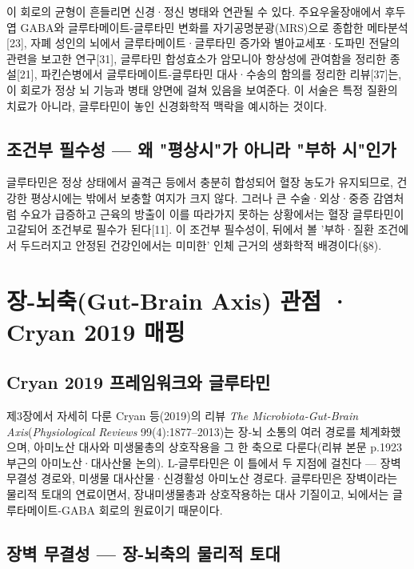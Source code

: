 \documentclass[12pt,oneside]{book}
\begin{document}
이 회로의 균형이 흔들리면 신경·정신 병태와 연관될 수 있다. 주요우울장애에서 후두엽 GABA와 글루타메이트-글루타민 변화를 자기공명분광(MRS)으로 종합한 메타분석[23], 자폐 성인의 뇌에서 글루타메이트·글루타민 증가와 별아교세포·도파민 전달의 관련을 보고한 연구[31], 글루타민 합성효소가 암모니아 항상성에 관여함을 정리한 종설[21], 파킨슨병에서 글루타메이트-글루타민 대사·수송의 함의를 정리한 리뷰[37]는, 이 회로가 정상 뇌 기능과 병태 양면에 걸쳐 있음을 보여준다. 이 서술은 특정 질환의 치료가 아니라, 글루타민이 놓인 신경화학적 맥락을 예시하는 것이다.

\subsection{조건부 필수성 — 왜 "평상시"가 아니라 "부하 시"인가}

글루타민은 정상 상태에서 골격근 등에서 충분히 합성되어 혈장 농도가 유지되므로, 건강한 평상시에는 밖에서 보충할 여지가 크지 않다. 그러나 큰 수술·외상·중증 감염처럼 수요가 급증하고 근육의 방출이 이를 따라가지 못하는 상황에서는 혈장 글루타민이 고갈되어 조건부로 필수가 된다[11]. 이 조건부 필수성이, 뒤에서 볼 '부하·질환 조건에서 두드러지고 안정된 건강인에서는 미미한' 인체 근거의 생화학적 배경이다(§8).

\section{장-뇌축(Gut-Brain Axis) 관점 · Cryan 2019 매핑}

\subsection{Cryan 2019 프레임워크와 글루타민}

제3장에서 자세히 다룬 Cryan 등(2019)의 리뷰 \textit{The Microbiota-Gut-Brain Axis}(\textit{Physiological Reviews} 99(4):1877–2013)는 장-뇌 소통의 여러 경로를 체계화했으며, 아미노산 대사와 미생물총의 상호작용을 그 한 축으로 다룬다(리뷰 본문 p.1923 부근의 아미노산·대사산물 논의). L-글루타민은 이 틀에서 두 지점에 걸친다 — 장벽 무결성 경로와, 미생물 대사산물·신경활성 아미노산 경로다. 글루타민은 장벽이라는 물리적 토대의 연료이면서, 장내미생물총과 상호작용하는 대사 기질이고, 뇌에서는 글루타메이트-GABA 회로의 원료이기 때문이다.

\subsection{장벽 무결성 — 장-뇌축의 물리적 토대}
\end{document}
